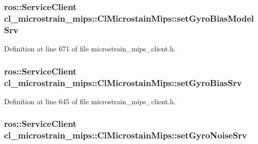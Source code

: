 \subsubsection[{\texorpdfstring{set\+Gyro\+Bias\+Model\+Srv}{setGyroBiasModelSrv}}]{\setlength{\rightskip}{0pt plus 5cm}ros\+::\+Service\+Client cl\+\_\+microstrain\+\_\+mips\+::\+Cl\+Microstain\+Mips\+::set\+Gyro\+Bias\+Model\+Srv\hspace{0.3cm}{\ttfamily [protected]}}\hypertarget{classcl__microstrain__mips_1_1ClMicrostainMips_a96fa3777b87a5d8abcb0f5fe6d740934}{}\label{classcl__microstrain__mips_1_1ClMicrostainMips_a96fa3777b87a5d8abcb0f5fe6d740934}


Definition at line 671 of file microstrain\+\_\+mips\+\_\+client.\+h.

\subsubsection[{\texorpdfstring{set\+Gyro\+Bias\+Srv}{setGyroBiasSrv}}]{\setlength{\rightskip}{0pt plus 5cm}ros\+::\+Service\+Client cl\+\_\+microstrain\+\_\+mips\+::\+Cl\+Microstain\+Mips\+::set\+Gyro\+Bias\+Srv\hspace{0.3cm}{\ttfamily [protected]}}\hypertarget{classcl__microstrain__mips_1_1ClMicrostainMips_a29fcea0897ca3bd7a036ab5c1856b86c}{}\label{classcl__microstrain__mips_1_1ClMicrostainMips_a29fcea0897ca3bd7a036ab5c1856b86c}


Definition at line 645 of file microstrain\+\_\+mips\+\_\+client.\+h.

\subsubsection[{\texorpdfstring{set\+Gyro\+Noise\+Srv}{setGyroNoiseSrv}}]{\setlength{\rightskip}{0pt plus 5cm}ros\+::\+Service\+Client cl\+\_\+microstrain\+\_\+mips\+::\+Cl\+Microstain\+Mips\+::set\+Gyro\+Noise\+Srv\hspace{0.3cm}{\ttfamily [protected]}}\hypertarget{classcl__microstrain__mips_1_1ClMicrostainMips_a712c389ca54fa2ebe89ffd601b03bd37}{}\label{classcl__microstrain__mips_1_1ClMicrostainMips_a712c389ca54fa2ebe89ffd601b03bd37}


